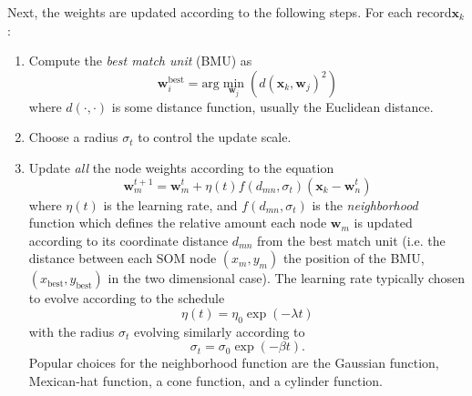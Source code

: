 Next, the weights are updated according to the following steps. For each record$\mathbf{x}_k$:
\begin{enumerate}
\item Compute the \textit{best match unit} (BMU) as
  \begin{equation}
    \mathbf{w}_{i}^{\text{best}} = \text{arg}\min\limits_{\mathbf{w}_j} \left( d(\mathbf{x}_k, \mathbf{w}_j)^2 \right)
  \end{equation}
  where $d(\cdot,\cdot)$ is some distance function, usually the Euclidean distance.
\item Choose a radius $\sigma_t$ to control the update scale.
\item Update \textit{all} the node weights according to the equation
  \begin{equation}
    \mathbf{w}_{m}^{t+1} = \mathbf{w}_m^{t} + \eta(t)f(d_{mn},\sigma_t)\left(\mathbf{x}_k  - \mathbf{w}_n^{t} \right)
  \end{equation}
  where $\eta(t)$ is the learning rate, and $f(d_{mn}, \sigma_t)$ is the
  \textit{neighborhood} function which defines the relative amount each node
  $\mathbf{w}_m$ is updated according to its coordinate distance $d_{mn}$ from
  the best match unit (i.e. the distance between each SOM node $(x_m, y_m)$
  the position of the BMU, $(x_{\text{best}}, y_{\text{best}})$ in the two
  dimensional case). The learning rate typically chosen to evolve according to
  the schedule
  \begin{equation}
    \eta(t) = \eta_0\exp(-\lambda t)
  \end{equation}
  with the radius $\sigma_t$ evolving similarly according to
  \begin{equation}
    \sigma_t = \sigma_0\exp(-\beta t).
  \end{equation}
  Popular choices for the neighborhood function are the Gaussian function,
  Mexican-hat function, a cone function, and a cylinder function.
\end{enumerate}

